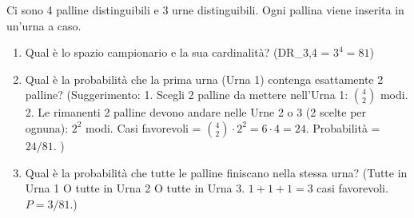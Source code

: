 \begin{exercise}
Ci sono 4 palline distinguibili e 3 urne distinguibili. Ogni pallina viene inserita in un'urna a caso.
\begin{enumerate}
    \item Qual è lo spazio campionario e la sua cardinalità? (DR_{3,4} = $3^4=81$)
    \item Qual è la probabilità che la prima urna (Urna 1) contenga esattamente 2 palline?
    (Suggerimento:
    1. Scegli 2 palline da mettere nell'Urna 1: $\binom{4}{2}$ modi.
    2. Le rimanenti 2 palline devono andare nelle Urne 2 o 3 (2 scelte per ognuna): $2^2$ modi.
    Casi favorevoli = $\binom{4}{2} \cdot 2^2 = 6 \cdot 4 = 24$. Probabilità = $24/81$.
    )
    \item Qual è la probabilità che tutte le palline finiscano nella stessa urna?
    (Tutte in Urna 1 O tutte in Urna 2 O tutte in Urna 3. $1+1+1 = 3$ casi favorevoli. $P=3/81$.)
\end{enumerate}
\end{exercise}

